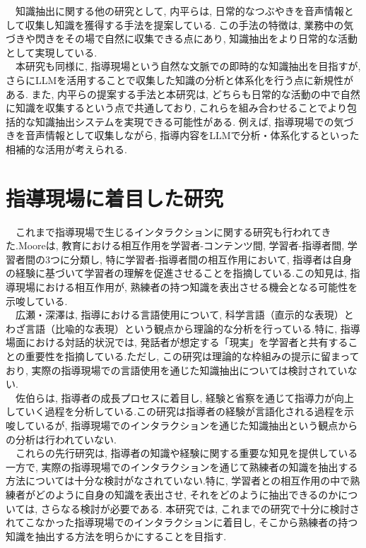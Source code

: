 　知識抽出に関する他の研究として, 内平ら\cite{Uchihira2022}は, 日常的なつぶやきを音声情報として収集し知識を獲得する手法を提案している. この手法の特徴は, 業務中の気づきや閃きをその場で自然に収集できる点にあり, 知識抽出をより日常的な活動として実現している. \\

　本研究も同様に, 指導現場という自然な文脈での即時的な知識抽出を目指すが, さらにLLMを活用することで収集した知識の分析と体系化を行う点に新規性がある. また, 内平らの提案する手法と本研究は, どちらも日常的な活動の中で自然に知識を収集するという点で共通しており, これらを組み合わせることでより包括的な知識抽出システムを実現できる可能性がある. 例えば, 指導現場での気づきを音声情報として収集しながら, 指導内容をLLMで分析・体系化するといった相補的な活用が考えられる.\\



\section{指導現場に着目した研究}
　これまで指導現場で生じるインタラクションに関する研究も行われてきた.Moore\cite{Moore1989}は, 教育における相互作用を学習者-コンテンツ間, 学習者-指導者間, 学習者間の3つに分類し, 特に学習者-指導者間の相互作用において, 指導者は自身の経験に基づいて学習者の理解を促進させることを指摘している.この知見は, 指導現場における相互作用が, 熟練者の持つ知識を表出させる機会となる可能性を示唆している.\\

　広瀬・深澤\cite{Hirose2018}は, 指導における言語使用について, 科学言語（直示的な表現）とわざ言語（比喩的な表現）という観点から理論的な分析を行っている.特に, 指導場面における対話的状況では, 発話者が想定する「現実」を学習者と共有することの重要性を指摘している.ただし, この研究は理論的な枠組みの提示に留まっており, 実際の指導現場での言語使用を通じた知識抽出については検討されていない.\\

　佐伯ら\cite{Saeki2017}は, 指導者の成長プロセスに着目し, 経験と省察を通じて指導力が向上していく過程を分析している.この研究は指導者の経験が言語化される過程を示唆しているが, 指導現場でのインタラクションを通じた知識抽出という観点からの分析は行われていない.\\

　これらの先行研究は, 指導者の知識や経験に関する重要な知見を提供している一方で, 実際の指導現場でのインタラクションを通じて熟練者の知識を抽出する方法については十分な検討がなされていない.特に, 学習者との相互作用の中で熟練者がどのように自身の知識を表出させ, それをどのように抽出できるのかについては, さらなる検討が必要である.
本研究では, これまでの研究で十分に検討されてこなかった指導現場でのインタラクションに着目し, そこから熟練者の持つ知識を抽出する方法を明らかにすることを目指す.\\



